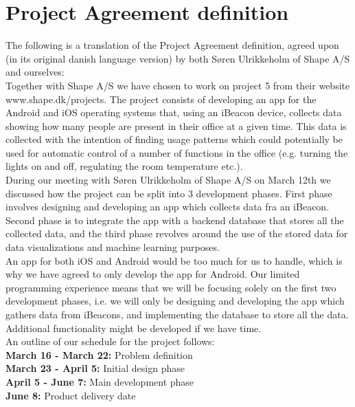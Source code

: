 \documentclass[12pt]{article}
\begin{document}
\newpage
\section{Project Agreement definition}

The following is a translation of the Project Agreement definition, agreed upon (in its original danish language version) by both S\o ren Ulrikkeholm of Shape A/S and ourselves:\\

Together with Shape A/S we have chosen to work on project 5 from their website www.shape.dk/projects. The project consists of developing an app for the Android and iOS operating systems that, using an iBeacon device, collects data showing how many people are present in their office at a given time. This data is collected with the intention of finding usage patterns which could potentially be used for automatic control of a number of functions in the office (e.g. turning the lights on and off, regulating the room temperature etc.).\\

During our meeting with S\o ren Ulrikkeholm of Shape A/S on March 12th we discussed how the project can be split into 3 development phases. First phase involves designing and developing an app which collects data fra an iBeacon. Second phase is to integrate the app with a backend database that stores all the collected data, and the third phase revolves around the use of the stored data for data visualizations and machine learning purposes.\\

An app for both iOS and Android would be too much for us to handle, which is why we have agreed to only develop the app for Android. Our limited programming experience means that we will be focusing solely on the first two development phases, i.e. we will only be designing and developing the app which gathers data from iBeacons, and implementing the database to store all the data. Additional functionality might be developed if we have time.\\

An outline of our schedule for the project follows:\\

\textbf{March 16 - March 22:} Problem definition\\
\textbf{March 23 - April 5:} Initial design phase\\
\textbf{April 5 - June 7:} Main development phase\\
\textbf{June 8:} Product delivery date\\
\end{document}
